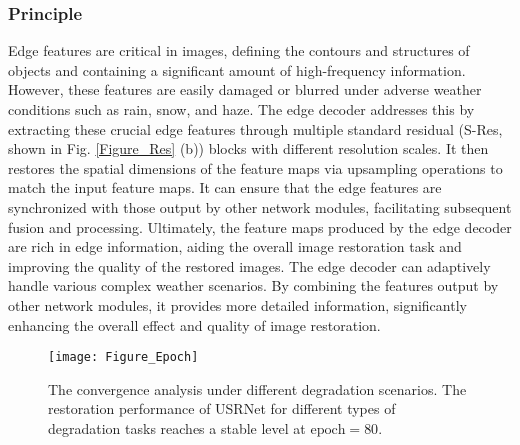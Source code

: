 \documentclass[final,12pt]{elsarticle}
\begin{document}
\subsubsection{Principle}
%
    Edge features are critical in images, defining the contours and structures of objects and containing a significant amount of high-frequency information. However, these features are easily damaged or blurred under adverse weather conditions such as rain, snow, and haze. The edge decoder addresses this by extracting these crucial edge features through multiple standard residual (S-Res, shown in Fig. \ref{Figure_Res} (b)) blocks with different resolution scales. It then restores the spatial dimensions of the feature maps via upsampling operations to match the input feature maps. It can ensure that the edge features are synchronized with those output by other network modules, facilitating subsequent fusion and processing. Ultimately, the feature maps produced by the edge decoder are rich in edge information, aiding the overall image restoration task and improving the quality of the restored images. The edge decoder can adaptively handle various complex weather scenarios. By combining the features output by other network modules, it provides more detailed information, significantly enhancing the overall effect and quality of image restoration.
    \begin{figure}[t]
        \centering
        \texttt{[image: Figure\_Epoch]}
        \caption{The convergence analysis under different degradation scenarios. The restoration performance of USRNet for different types of degradation tasks reaches a stable level at $\text{epoch}  = 80$.}
        \label{Figure_epoch}
    \end{figure}
%
%   
\end{document}
